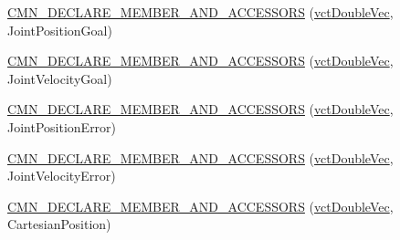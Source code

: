 {\bf }\par
\begin{DoxyCompactItemize}
\item 
\hyperlink{classprm_robot_state_aeda6302c5525f6742919fe801e31ef8f}{C\+M\+N\+\_\+\+D\+E\+C\+L\+A\+R\+E\+\_\+\+M\+E\+M\+B\+E\+R\+\_\+\+A\+N\+D\+\_\+\+A\+C\+C\+E\+S\+S\+O\+R\+S} (\hyperlink{vct_dynamic_vector_types_8h_ade4b3068c86fb88f41af2e5187e491c2}{vct\+Double\+Vec}, Joint\+Position\+Goal)
\end{DoxyCompactItemize}

{\bf }\par
\begin{DoxyCompactItemize}
\item 
\hyperlink{classprm_robot_state_a88664290a459f8303d5990b5fcb607cd}{C\+M\+N\+\_\+\+D\+E\+C\+L\+A\+R\+E\+\_\+\+M\+E\+M\+B\+E\+R\+\_\+\+A\+N\+D\+\_\+\+A\+C\+C\+E\+S\+S\+O\+R\+S} (\hyperlink{vct_dynamic_vector_types_8h_ade4b3068c86fb88f41af2e5187e491c2}{vct\+Double\+Vec}, Joint\+Velocity\+Goal)
\end{DoxyCompactItemize}

{\bf }\par
\begin{DoxyCompactItemize}
\item 
\hyperlink{classprm_robot_state_ab0a13ab8a9d5d48f56dd93af64c31bcc}{C\+M\+N\+\_\+\+D\+E\+C\+L\+A\+R\+E\+\_\+\+M\+E\+M\+B\+E\+R\+\_\+\+A\+N\+D\+\_\+\+A\+C\+C\+E\+S\+S\+O\+R\+S} (\hyperlink{vct_dynamic_vector_types_8h_ade4b3068c86fb88f41af2e5187e491c2}{vct\+Double\+Vec}, Joint\+Position\+Error)
\end{DoxyCompactItemize}

{\bf }\par
\begin{DoxyCompactItemize}
\item 
\hyperlink{classprm_robot_state_a9b673dcbacb983c18950e3477ae5bfe2}{C\+M\+N\+\_\+\+D\+E\+C\+L\+A\+R\+E\+\_\+\+M\+E\+M\+B\+E\+R\+\_\+\+A\+N\+D\+\_\+\+A\+C\+C\+E\+S\+S\+O\+R\+S} (\hyperlink{vct_dynamic_vector_types_8h_ade4b3068c86fb88f41af2e5187e491c2}{vct\+Double\+Vec}, Joint\+Velocity\+Error)
\end{DoxyCompactItemize}

{\bf }\par
\begin{DoxyCompactItemize}
\item 
\hyperlink{classprm_robot_state_acd86b85963d6ff0fcaaf20d203a07337}{C\+M\+N\+\_\+\+D\+E\+C\+L\+A\+R\+E\+\_\+\+M\+E\+M\+B\+E\+R\+\_\+\+A\+N\+D\+\_\+\+A\+C\+C\+E\+S\+S\+O\+R\+S} (\hyperlink{vct_dynamic_vector_types_8h_ade4b3068c86fb88f41af2e5187e491c2}{vct\+Double\+Vec}, Cartesian\+Position)
\end{DoxyCompactItemize}

